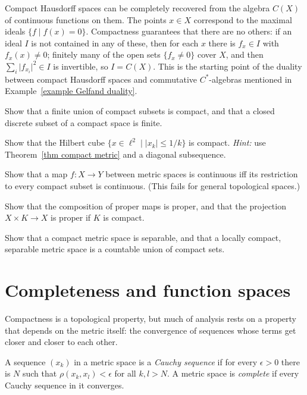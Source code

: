 \begin{rem}
    Compact Hausdorff spaces can be completely recovered from the algebra $C(X)$ of continuous functions on them. The points $x\in X$ correspond to the maximal ideals $\{f\mid f(x)=0\}$. Compactness guarantees that there are no others: if an ideal $I$ is not contained in any of these, then for each $x$ there is $f_x\in I$ with $f_x(x)\neq0$; finitely many of the open sets $\{f_x\neq0\}$ cover $X$, and then $\sum_i\lvert f_{x_i}\rvert^2\in I$ is invertible, so $I=C(X)$. This is the starting point of the duality between compact Hausdorff spaces and commutative $C^\ast$-algebras mentioned in Example~\ref{example Gelfand duality}.
\end{rem}

\begin{xca}
    Show that a finite union of compact subsets is compact, and that a closed discrete subset of a compact space is finite.
\end{xca}
\begin{xca}\label{xca Hilbert cube}
    Show that the Hilbert cube $\{x\in\ell^2\mid\lvert x_k\rvert\leq 1/k\}$ is compact. \emph{Hint:} use Theorem~\ref{thm compact metric} and a diagonal subsequence.
\end{xca}
\begin{xca}
    Show that a map $f:X\to Y$ between metric spaces is continuous iff its restriction to every compact subset is continuous. (This fails for general topological spaces.)
\end{xca}
\begin{xca}
    Show that the composition of proper maps is proper, and that the projection $X\times K\to X$ is proper if $K$ is compact.
\end{xca}
\begin{xca}
    Show that a compact metric space is separable, and that a locally compact, separable metric space is a countable union of compact sets.
\end{xca}


\section{Completeness and function spaces}\label{sec: completeness}

Compactness is a topological property, but much of analysis rests on a property that depends on the metric itself: the convergence of sequences whose terms get closer and closer to each other.

\begin{defn}[Completeness]
    A sequence $(x_k)$ in a metric space is a \emph{Cauchy sequence} if for every $\epsilon>0$ there is $N$ such that $\rho(x_k,x_l)<\epsilon$ for all $k,l>N$. A metric space is \emph{complete} if every Cauchy sequence in it converges.
\end{defn}

